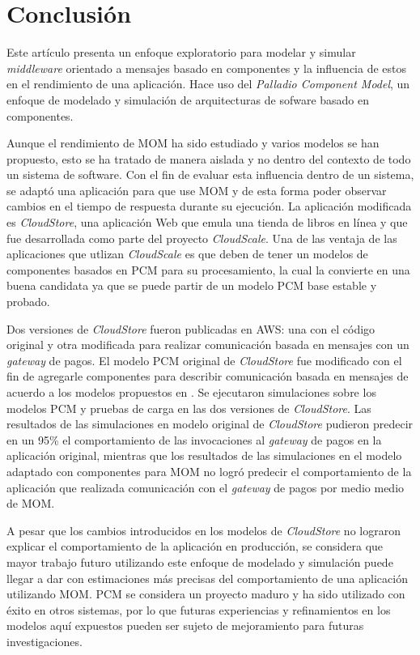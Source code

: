 \documentclass[article]{IEEEtran}
\begin{document}
\section{Conclusión} \label{sec:conclusion}
Este artículo presenta un enfoque exploratorio para modelar y simular \emph{middleware} orientado a mensajes basado en componentes y la influencia de estos en el rendimiento de una aplicación. Hace uso del \emph{Palladio Component Model}, un enfoque de modelado y simulación de arquitecturas de sofware basado en componentes.

Aunque el rendimiento de MOM ha sido estudiado y varios modelos se han propuesto, esto se ha tratado de manera aislada y no dentro del contexto de todo un sistema de software. Con el fin de evaluar esta influencia dentro de un sistema, se adaptó una aplicación para que use MOM y de esta forma poder observar cambios en el tiempo de respuesta durante su ejecución. La aplicación modificada es \emph{CloudStore}, una aplicación Web que emula una tienda de libros en línea y que fue desarrollada como parte del proyecto \emph{CloudScale}. Una de las ventaja de las aplicaciones que utlizan \emph{CloudScale} es que deben de tener un modelos de componentes basados en PCM para su procesamiento, la cual la convierte en una buena candidata ya que se puede partir de un modelo PCM base estable y probado.

Dos versiones de \emph{CloudStore} fueron publicadas en AWS: una con el código original y otra modificada para realizar comunicación basada en mensajes con un \emph{gateway} de pagos. El modelo PCM original de \emph{CloudStore} fue modificado con el fin de agregarle componentes para describir comunicación basada en mensajes de acuerdo a los modelos propuestos en \cite{happe-et-al}. Se ejecutaron simulaciones sobre los modelos PCM y pruebas de carga en las dos versiones de \emph{CloudStore}. Las resultados de las simulaciones en modelo original de \emph{CloudStore} pudieron predecir en un 95\% el comportamiento de las invocaciones al \emph{gateway} de pagos en la aplicación original, mientras que los resultados de las simulaciones en el modelo adaptado con componentes para MOM no logró predecir el comportamiento de la aplicación que realizada comunicación con el \emph{gateway} de pagos por medio medio de MOM. 
 
A pesar que los cambios introducidos en los modelos de \emph{CloudStore} no lograron explicar el comportamiento de la aplicación en producción, se considera que mayor trabajo futuro utilizando este enfoque de modelado y simulación puede llegar a dar con estimaciones más precisas del comportamiento de una aplicación utilizando MOM. PCM se considera un proyecto maduro y ha sido utilizado con éxito en otros sistemas, por lo que futuras experiencias y refinamientos en los modelos aquí expuestos pueden ser sujeto de mejoramiento para futuras investigaciones.
\end{document}

